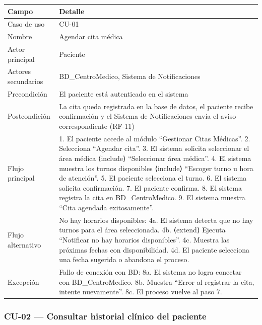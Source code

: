 \documentclass[11pt,a4paper]{article}
\begin{document}
	\begin{longtable}{p{} p{} }
		
		
		\toprule
		\textbf{Campo} &
		\textbf{Detalle}  \\
		\midrule
		\endhead
		
		Caso de uso & CU-01 \\
		Nombre & Agendar cita médica \\
		Actor principal & Paciente \\
		Actores secundarios & BD\_CentroMedico, Sistema de Notificaciones \\
		Precondición & El paciente está autenticado en el sistema \\
		Postcondición & La cita queda registrada en la base de datos, el paciente recibe confirmación y el Sistema de Notificaciones envía el aviso correspondiente (RF-11) \\
		Flujo principal & 1. El paciente accede al módulo ``Gestionar Citas Médicas''. 2. Selecciona ``Agendar cita''. 3. El sistema solicita seleccionar el área médica ⟨include⟩ ``Seleccionar área médica''. 4. El sistema muestra los turnos disponibles ⟨include⟩ ``Escoger turno u hora de atención''. 5. El paciente selecciona el turno. 6. El sistema solicita confirmación. 7. El paciente confirma. 8. El sistema registra la cita en BD\_CentroMedico. 9. El sistema muestra ``Cita agendada exitosamente''. \\
		Flujo alternativo & No hay horarios disponibles: 4a. El sistema detecta que no hay turnos para el área seleccionada. 4b. ⟨extend⟩ Ejecuta ``Notificar no hay horarios disponibles''. 4c. Muestra las próximas fechas con disponibilidad. 4d. El paciente selecciona una fecha sugerida o abandona el proceso. \\
		Excepción & Fallo de conexión con BD: 8a. El sistema no logra conectar con BD\_CentroMedico. 8b. Muestra ``Error al registrar la cita, intente nuevamente''. 8c. El proceso vuelve al paso 7. \\
		\bottomrule
	\end{longtable}
	
	\subsubsection{CU-02 --- Consultar historial clínico del paciente}
	
\end{document}

